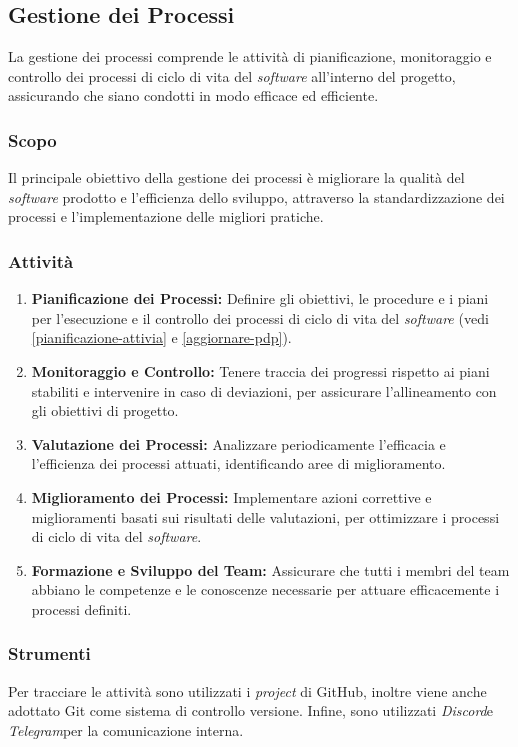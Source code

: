 \subsection{Gestione dei Processi}

La gestione dei processi comprende le attività di pianificazione, monitoraggio
e controllo dei processi di ciclo di vita del \textit{software} all'interno del
progetto, assicurando che siano condotti in modo efficace ed efficiente.

\subsubsection{Scopo}
Il principale obiettivo della gestione dei processi è migliorare la qualità
del \textit{software} prodotto e l'efficienza dello sviluppo, attraverso la
standardizzazione dei processi e l'implementazione delle migliori pratiche.

\subsubsection{Attività}
\begin{enumerate}
	\item \textbf{Pianificazione dei Processi:} Definire gli obiettivi, le
	      procedure e i piani per l'esecuzione e il controllo dei processi di
	      ciclo di vita del \textit{software} (vedi
	      \autoref{pianificazione-attivia} e \autoref{aggiornare-pdp}).
	\item \textbf{Monitoraggio e Controllo:} Tenere traccia dei progressi
	      rispetto ai piani stabiliti e intervenire in caso di deviazioni, per
	      assicurare l'allineamento con gli obiettivi di progetto.
	\item \textbf{Valutazione dei Processi:} Analizzare periodicamente
	      l'efficacia e l'efficienza dei processi attuati, identificando aree di
	      miglioramento.
	\item \textbf{Miglioramento dei Processi:} Implementare azioni correttive e
	      miglioramenti basati sui risultati delle valutazioni, per ottimizzare
	      i processi di ciclo di vita del \textit{software}.
	\item \textbf{Formazione e Sviluppo del Team:} Assicurare che tutti i membri
	      del team abbiano le competenze e le conoscenze necessarie per attuare
	      efficacemente i processi definiti.
\end{enumerate}

\subsubsection{Strumenti}
Per tracciare le attività sono utilizzati i \textit{project} di GitHub\g, inoltre
viene anche adottato Git come sistema di controllo versione. Infine, sono
utilizzati \textit{Discord}\g e \textit{Telegram}\g per la comunicazione interna.


